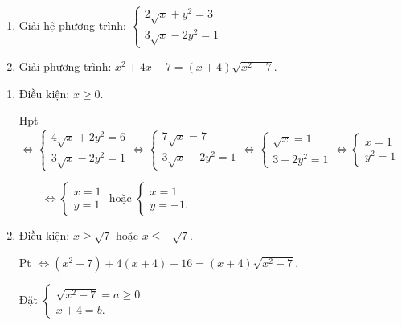 \begin{ex}%
\hfill
    \begin{enumerate}
        \item Giải hệ phương trình: $\begin{cases}
        2 \sqrt{x}+y^2=3\\3 \sqrt{x}-2y^2=1
        \end{cases}$
        \item Giải phương trình: $x^2+4x-7=(x+4)\sqrt{x^2-7}$.
    \end{enumerate}

\loigiai
    {   
    \begin{enumerate}
    \item Điều kiện: $x \ge 0$.
    
    Hpt $\Leftrightarrow \begin{cases}
    4 \sqrt{x}+2y^2=6\\3\sqrt{x}-2y^2=1
    \end{cases} \Leftrightarrow \begin{cases}
    7\sqrt{x}=7 \\ 3 \sqrt{x}-2y^2=1
    \end{cases} \Leftrightarrow \begin{cases}
    \sqrt{x}=1 \\ 3-2y^2=1
    \end{cases} \Leftrightarrow \begin{cases}
    x=1 \\ y^2=1
    \end{cases}$
    
    $\qquad \Leftrightarrow \begin{cases}
    x=1 \\y=1
    \end{cases}$ hoặc $\begin{cases}
    x=1 \\y=-1.
    \end{cases}$
    
    \item Điều kiện: $x \ge \sqrt{7}$ hoặc $x \le - \sqrt{7}$.
    
    Pt $\Leftrightarrow (x^2-7)+4(x+4)-16=(x+4) \sqrt{x^2-7}$.
    
    Đặt $\begin{cases}
    \sqrt{x^2-7}=a \ge 0 \\ x+4=b.
    \end{cases}$
    

\end{enumerate}}
\end{ex}
